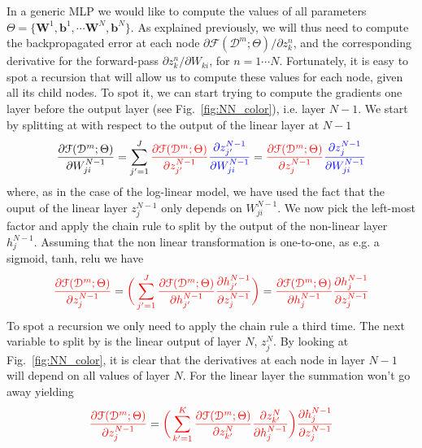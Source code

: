 In a generic MLP we would like to compute the values of all parameters $\Theta=\{\mathbf{W}^1, \mathbf{b}^1, \cdots \mathbf{W}^N, \mathbf{b}^N\}$. As explained previously, we will thus need to compute the backpropagated error at each node $\partial \mathcal{F}(\mathcal{D}^m;\Theta)/\partial z_k^n$, and the corresponding derivative for the forward-pass $\partial z_k^n/\partial W_{ki}$, for $n = 1 \cdots N$. Fortunately, it is easy to spot a recursion that will allow us to compute these values for each node, given all its child nodes. To spot it, we can start trying to compute the gradients one layer before the output layer (see Fig.~\ref{fig:NN_color}), i.e. layer $N-1$. We start by splitting at with respect to the output of the linear layer at $N-1$
%
\begin{align}
        \frac{\partial \mathcal{F}(\mathcal{D}^m;\Theta)}{\partial W_{ji}^{N-1}} = \sum_{j'=1}^{J} {\color{red} \frac{\partial \mathcal{F}(\mathcal{D}^m;\Theta)}{\partial z_{j'}^{N-1}}} {\color{blue} \frac{\partial z_{j'}^{N-1}}{\partial W_{ji}^{N-1}}} = {\color{red} \frac{\partial \mathcal{F}(\mathcal{D}^m;\Theta)}{\partial z_{j}^{N-1}}} {\color{blue} \frac{\partial z_{j}^{N-1}}{\partial W_{ji}^{N-1}}}
\label{eq:BPderivation1}
\end{align}
%
where, as in the case of the log-linear model, we have used the fact that the ouput of the linear layer $z_j^{N-1}$ only depends on $W_{ji}^{N-1}$. We now pick the left-most factor and apply the chain rule to split by the output of the non-linear layer $h_j^{N-1}$. Assuming that the non linear transformation is one-to-one, as e.g. a sigmoid, tanh, relu we have
%
\begin{align}
        {\color{red} \frac{\partial \mathcal{F}(\mathcal{D}^m;\Theta)}{\partial z_{j}^{N-1}}} = {\color{red} \bigg(\sum_{j'=1}^{J} \frac{\partial \mathcal{F}(\mathcal{D}^m;\Theta)}{\partial h_{j'}^{N-1}} \frac{\partial h_{j'}^{N-1}}{\partial z_{j}^{N-1}}\bigg)} = {\color{red} \frac{\partial \mathcal{F}(\mathcal{D}^m;\Theta)}{\partial h_{j}^{N-1}} \frac{\partial h_{j}^{N-1}}{\partial z_{j}^{N-1}}}
\label{eq:BPderivation2}
\end{align}
%
To spot a recursion we only need to apply the chain rule a third time. The next variable to split by is the linear output of layer $N$, $z_j^{N}$. By looking at Fig.~\ref{fig:NN_color}, it is clear that the derivatives at each node in layer $N-1$ will depend on all values of layer $N$. For the linear layer the summation won't go away yielding
%
\begin{align}
        {\color{red} \frac{\partial \mathcal{F}(\mathcal{D}^m;\Theta)}{\partial z_{j}^{N-1}}} = {\color{red} \bigg(\sum_{k'=1}^{K} \frac{\partial \mathcal{F}(\mathcal{D}^m;\Theta)}{\partial z_{k'}^{N}} \frac{\partial z_{k'}^{N}}{\partial h_{j}^{N-1}}\bigg)\frac{\partial h_{j}^{N-1}}{\partial z_{j}^{N-1}}}
\label{eq:BPderivation3}
\end{align}
